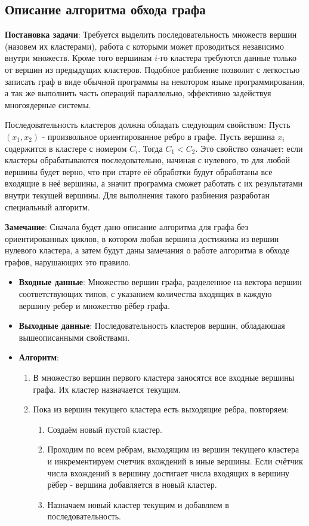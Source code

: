 \subsection{Описание алгоритма обхода графа}
\label{sec:algtraverse}
\textbf{Постановка задачи}: Требуется выделить последовательность множеств вершин (назовем их кластерами), работа с которыми может проводиться независимо внутри множеств. Кроме того вершинам $i$-го кластера требуются данные только от вершин из предыдущих кластеров. Подобное разбиение позволит с легкостью записать граф в виде обычной программы на некотором языке программирования, а так же выполнить часть операций параллельно, эффективно задействуя многоядерные системы.
\par
Последовательность кластеров должна обладать следующим свойством: Пусть $(x_1, x_2)$ - произвольное ориентированное ребро в графе. Пусть вершина $x_i$ содержится в кластере с номером $C_i$. Тогда $C_1 < C_2$. Это свойство означает: если кластеры обрабатываются последовательно, начиная с нулевого, то для любой вершины будет верно, что при старте её обработки будут обработаны все входящие в неё вершины, а значит программа сможет работать с их результатами внутри текущей вершины. Для выполнения такого разбиения разработан специальный алгоритм. 
\par
\textbf{Замечание}: Сначала будет дано описание алгоритма для графа без ориентированных циклов, в котором любая вершина достижима из вершин нулевого кластера, а затем будут даны замечания о работе алгоритма в обходе графов, нарушающих это правило.
\begin{itemize}
	\item \textbf{Входные данные}: Множество вершин графа, разделенное на вектора вершин соответствующих типов, с указанием количества входящих в каждую вершину ребер и множество рёбер графа.
	\item \textbf{Выходные данные}: Последовательность кластеров вершин, обладаюшая вышеописанными свойствами. 
	\item \textbf{Алгоритм}: \begin{enumerate}
	    \item В множество вершин первого кластера заносятся все входные вершины графа. Их кластер назначается текущим.
	    \item Пока из вершин текущего кластера есть выходящие ребра, повторяем:
	    \begin{enumerate}
		\item Создаём новый пустой кластер.
	        \item Проходим по всем ребрам, выходящим из вершин текущего кластера и инкрементируем счетчик вхождений в иные вершины. Если счётчик числа вхождений в вершину достигает числа входящих в вершину рёбер - вершина добавляется в новый кластер.
		\item Назначаем новый кластер текущим и добавляем в последовательность. 
	    \end{enumerate}
	\end{enumerate}
\end{itemize}

